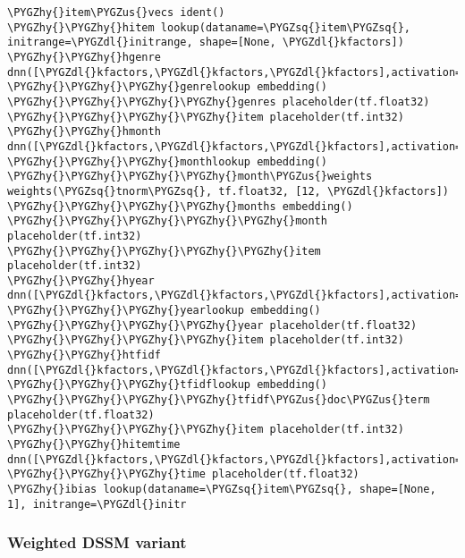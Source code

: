 \documentclass[letterpaper,10pt,english]{sphinxmanual}
\def\PYGZus{\char`\_}
\def\PYGZdl{\char`\$}
\def\PYGZhy{\char`\-}
\def\PYGZsq{\char`\'}
\renewcommand\PYGZsq{\textquotesingle}
\begin{document}
\begin{Verbatim}[commandchars=\\\{\}]
\PYGZhy{}item\PYGZus{}vecs ident()
\PYGZhy{}\PYGZhy{}hitem lookup(dataname=\PYGZsq{}item\PYGZsq{}, initrange=\PYGZdl{}initrange, shape=[None, \PYGZdl{}kfactors])
\PYGZhy{}\PYGZhy{}hgenre dnn([\PYGZdl{}kfactors,\PYGZdl{}kfactors,\PYGZdl{}kfactors],activation=\PYGZsq{}tanh\PYGZsq{},bn=True,keep\PYGZus{}prob=None)
\PYGZhy{}\PYGZhy{}\PYGZhy{}genrelookup embedding()
\PYGZhy{}\PYGZhy{}\PYGZhy{}\PYGZhy{}genres placeholder(tf.float32)
\PYGZhy{}\PYGZhy{}\PYGZhy{}\PYGZhy{}item placeholder(tf.int32)
\PYGZhy{}\PYGZhy{}hmonth dnn([\PYGZdl{}kfactors,\PYGZdl{}kfactors,\PYGZdl{}kfactors],activation=\PYGZsq{}tanh\PYGZsq{},bn=True,keep\PYGZus{}prob=None)
\PYGZhy{}\PYGZhy{}\PYGZhy{}monthlookup embedding()
\PYGZhy{}\PYGZhy{}\PYGZhy{}\PYGZhy{}month\PYGZus{}weights weights(\PYGZsq{}tnorm\PYGZsq{}, tf.float32, [12, \PYGZdl{}kfactors])
\PYGZhy{}\PYGZhy{}\PYGZhy{}\PYGZhy{}months embedding()
\PYGZhy{}\PYGZhy{}\PYGZhy{}\PYGZhy{}\PYGZhy{}month placeholder(tf.int32)
\PYGZhy{}\PYGZhy{}\PYGZhy{}\PYGZhy{}\PYGZhy{}item placeholder(tf.int32)
\PYGZhy{}\PYGZhy{}hyear dnn([\PYGZdl{}kfactors,\PYGZdl{}kfactors,\PYGZdl{}kfactors],activation=\PYGZsq{}tanh\PYGZsq{},bn=True,keep\PYGZus{}prob=None)
\PYGZhy{}\PYGZhy{}\PYGZhy{}yearlookup embedding()
\PYGZhy{}\PYGZhy{}\PYGZhy{}\PYGZhy{}year placeholder(tf.float32)
\PYGZhy{}\PYGZhy{}\PYGZhy{}\PYGZhy{}item placeholder(tf.int32)
\PYGZhy{}\PYGZhy{}htfidf dnn([\PYGZdl{}kfactors,\PYGZdl{}kfactors,\PYGZdl{}kfactors],activation=\PYGZsq{}tanh\PYGZsq{},bn=True,keep\PYGZus{}prob=None)
\PYGZhy{}\PYGZhy{}\PYGZhy{}tfidflookup embedding()
\PYGZhy{}\PYGZhy{}\PYGZhy{}\PYGZhy{}tfidf\PYGZus{}doc\PYGZus{}term placeholder(tf.float32)
\PYGZhy{}\PYGZhy{}\PYGZhy{}\PYGZhy{}item placeholder(tf.int32)
\PYGZhy{}\PYGZhy{}hitemtime dnn([\PYGZdl{}kfactors,\PYGZdl{}kfactors,\PYGZdl{}kfactors],activation=\PYGZsq{}tanh\PYGZsq{},bn=True,keep\PYGZus{}prob=None)
\PYGZhy{}\PYGZhy{}\PYGZhy{}time placeholder(tf.float32)
\PYGZhy{}ibias lookup(dataname=\PYGZsq{}item\PYGZsq{}, shape=[None, 1], initrange=\PYGZdl{}initr
\end{Verbatim}


\subsubsection{Weighted DSSM variant}
\label{models:weighted-dssm-variant}\label{models:module-dsaddmodel}

\begin{fulllineitems}
\label{models:dsaddmodel.dsadd}
\end{fulllineitems}
\end{document}
